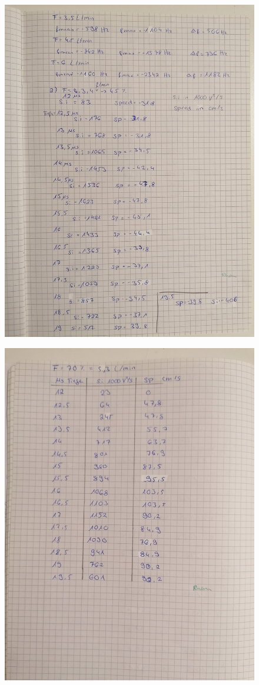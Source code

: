 \begin{figure}
    \centering
    \includegraphics[width=\textwidth]{content/Anhang2.jpg}
\end{figure}
    
\begin{figure}
    \centering
    \includegraphics[width=\textwidth]{content/Anhang3.jpg}
\end{figure}
    